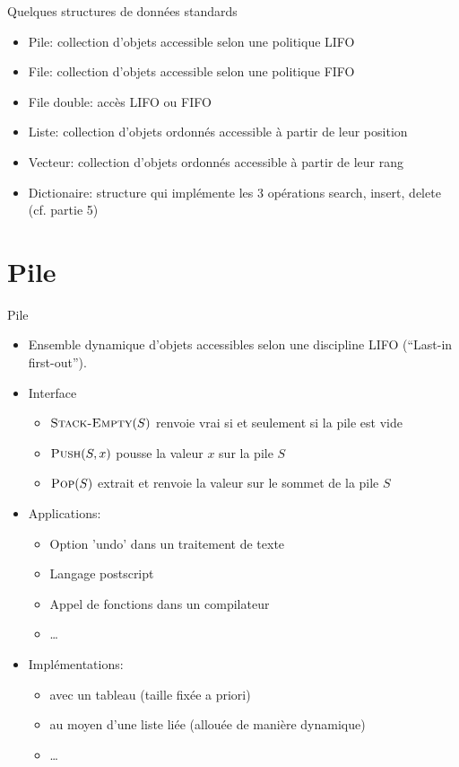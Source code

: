 \begin{frame}{Quelques structures de données standards}

\begin{itemize}
\item Pile: collection d'objets accessible selon une politique LIFO
\item File: collection d'objets accessible selon une politique FIFO
\item File double: accès LIFO ou FIFO
\item Liste: collection d'objets ordonnés accessible à partir de leur position
\item Vecteur: collection d'objets ordonnés accessible à partir de leur rang

\bigskip

\item Dictionaire: structure qui implémente les 3 opérations search, insert, delete (cf. partie 5)
\end{itemize}

\end{frame}

\section{Pile}

\begin{frame}{Pile}
\begin{itemize}
\item Ensemble dynamique d'objets accessibles selon une discipline
  \alert{LIFO} (``Last-in first-out'').
\item Interface
\begin{itemize}
\item $\textnormal{\scshape Stack-Empty}(S)$ renvoie vrai si et seulement si la pile est vide
\item $\textnormal{\scshape Push}(S,x)$ pousse la valeur $x$ sur la pile $S$
\item $\textnormal{\scshape Pop}(S)$ extrait et renvoie la valeur sur le sommet de la pile $S$
\end{itemize}
\item Applications:
\begin{itemize}
\item Option 'undo' dans un traitement de texte
\item Langage postscript
\item Appel de fonctions dans un compilateur
\item \ldots
\end{itemize}
\item Implémentations:
\begin{itemize}
\item avec un tableau (taille fixée a priori)
\item au moyen d'une liste liée (allouée de manière dynamique)
\item \ldots
\end{itemize}
\end{itemize}
\end{frame}

